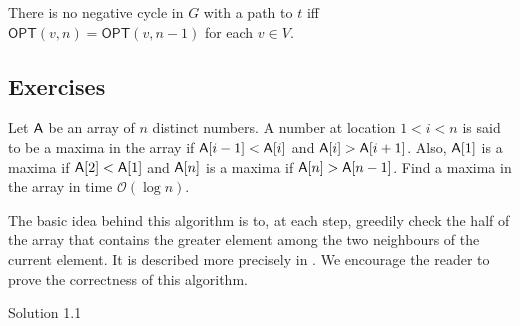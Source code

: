 \begin{lemma*}
	There is no negative cycle in $G$ with a path to $t$ iff $\mathsf{OPT}(v,n)=\mathsf{OPT}(v,n-1)$ for each $v\in V$.
\end{lemma*}

\subsection{Exercises}


	\begin{exercise}
	Let $\mathsf{A}$ be an array of $n$ distinct numbers. A number at location $1<i<n$ is said to be a maxima in the array if $\mathsf{A}[i-1]<\mathsf{A}[i]$ and $\mathsf{A}[i]>\mathsf{A}[i+1]$. Also, $\mathsf{A}[1]$ is a maxima if $\mathsf{A}[2]<\mathsf{A}[1]$ and $\mathsf{A}[n]$ is a maxima if $\mathsf{A}[n]>\mathsf{A}[n-1]$. Find a maxima in the array in time $\mathcal{O}(\log n)$.
	\end{exercise}
	\begin{solution*}
		The basic idea behind this algorithm is to, at each step, greedily check the half of the array that contains the greater element among the two neighbours of the current element. It is described more precisely in . We encourage the reader to prove the correctness of this algorithm.
	\end{solution*}
	\begin{algorithm}
		\DontPrintSemicolon
		\caption{Solution 1.1}\label{algo: find maxima}
	\end{algorithm}

